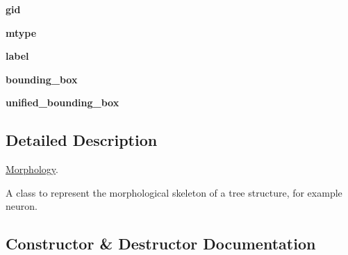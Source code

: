 \begin{DoxyCompactItemize}
\item 
{\bfseries gid}\hypertarget{classmeshy_1_1neuromorphovis_1_1morphologies_1_1__skeleton_1_1morphology_1_1Morphology_a588c2c3b1f461d9b77c65562ebec1e86}{}\label{classmeshy_1_1neuromorphovis_1_1morphologies_1_1__skeleton_1_1morphology_1_1Morphology_a588c2c3b1f461d9b77c65562ebec1e86}

\item 
{\bfseries mtype}\hypertarget{classmeshy_1_1neuromorphovis_1_1morphologies_1_1__skeleton_1_1morphology_1_1Morphology_a4d57857f3feb305589b7862ae2f86890}{}\label{classmeshy_1_1neuromorphovis_1_1morphologies_1_1__skeleton_1_1morphology_1_1Morphology_a4d57857f3feb305589b7862ae2f86890}

\item 
{\bfseries label}\hypertarget{classmeshy_1_1neuromorphovis_1_1morphologies_1_1__skeleton_1_1morphology_1_1Morphology_afcc3ba4bc867f49248aa3d35d3da2711}{}\label{classmeshy_1_1neuromorphovis_1_1morphologies_1_1__skeleton_1_1morphology_1_1Morphology_afcc3ba4bc867f49248aa3d35d3da2711}

\item 
{\bfseries bounding\+\_\+box}\hypertarget{classmeshy_1_1neuromorphovis_1_1morphologies_1_1__skeleton_1_1morphology_1_1Morphology_ab0996a921f30026938a987ca06544847}{}\label{classmeshy_1_1neuromorphovis_1_1morphologies_1_1__skeleton_1_1morphology_1_1Morphology_ab0996a921f30026938a987ca06544847}

\item 
{\bfseries unified\+\_\+bounding\+\_\+box}\hypertarget{classmeshy_1_1neuromorphovis_1_1morphologies_1_1__skeleton_1_1morphology_1_1Morphology_a26c90286027cd66ec38a77305b245745}{}\label{classmeshy_1_1neuromorphovis_1_1morphologies_1_1__skeleton_1_1morphology_1_1Morphology_a26c90286027cd66ec38a77305b245745}

\end{DoxyCompactItemize}


\subsection{Detailed Description}
\hyperlink{classmeshy_1_1neuromorphovis_1_1morphologies_1_1__skeleton_1_1morphology_1_1Morphology}{Morphology}. 

\begin{DoxyVerb}A class to represent the morphological skeleton of a tree structure, for example neuron.
\end{DoxyVerb}
 

\subsection{Constructor \& Destructor Documentation}
